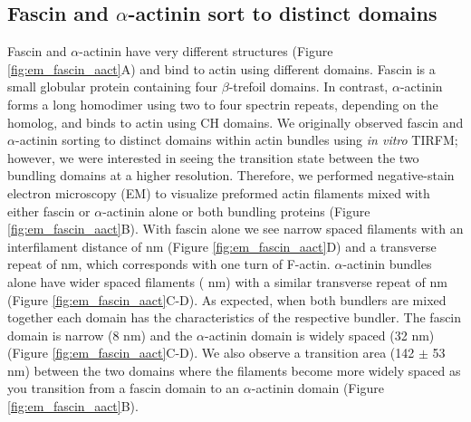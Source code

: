 \subsection{Fascin and \texorpdfstring{$\alpha$}{alpha}-actinin sort to distinct domains}
Fascin and $\alpha$-actinin have very different structures (Figure \ref{fig:em_fascin_aact}A) and bind to actin using different domains. Fascin is a small globular protein containing  four $\beta$-trefoil domains. In contrast, $\alpha$-actinin forms a long homodimer using two to four spectrin repeats, depending on the homolog, and binds to actin using CH domains. We originally observed fascin and $\alpha$-actinin sorting to distinct domains within actin bundles using \textit{in vitro} TIRFM; however, we were interested in seeing the transition state between the two bundling domains at a higher resolution. Therefore, we performed negative-stain electron microscopy (EM) to visualize preformed actin filaments mixed with either fascin or $\alpha$-actinin alone or both bundling proteins (Figure \ref{fig:em_fascin_aact}B). With fascin alone we see narrow spaced filaments with an interfilament distance of  nm (Figure \ref{fig:em_fascin_aact}D) and a transverse repeat of  nm, which corresponds with one turn of F-actin. $\alpha$-actinin bundles alone have wider spaced filaments ( nm) with a similar transverse repeat of  nm (Figure \ref{fig:em_fascin_aact}C-D). As expected, when both bundlers are mixed together each domain has the characteristics of the respective bundler. The fascin domain is narrow (8 nm) and the $\alpha$-actinin domain is widely spaced (32 nm) (Figure \ref{fig:em_fascin_aact}C-D). We also observe a transition area (142 $\pm$ 53 nm) between the two domains where the filaments become more widely spaced as you transition from a fascin domain to an $\alpha$-actinin domain (Figure \ref{fig:em_fascin_aact}B). 

